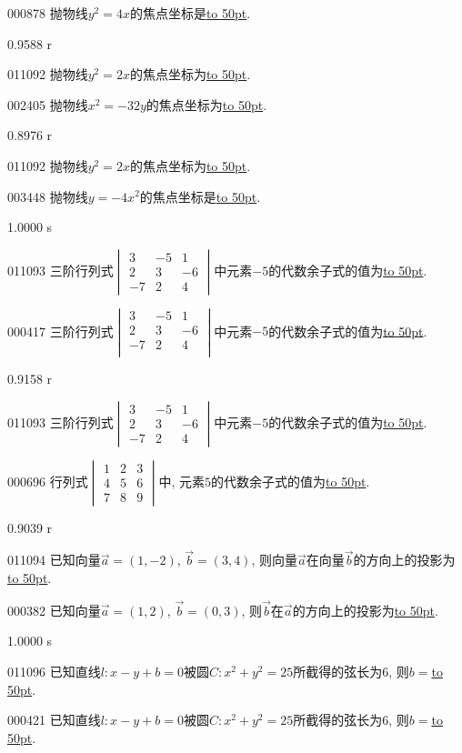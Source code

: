 \documentclass[10pt,a4paper]{article}
\newcommand{\blank}[1]{\underline{\hbox to #1pt{}}}
\begin{document}
000878	抛物线$y^2=4x$的焦点坐标是\blank{50}.

0.9588 r

011092	抛物线$y^2=2x$的焦点坐标为\blank{50}.

002405	抛物线$x^2=-32y$的焦点坐标为\blank{50}.

0.8976 r

011092	抛物线$y^2=2x$的焦点坐标为\blank{50}.

003448	抛物线$y=-4x^2$的焦点坐标是\blank{50}.

1.0000 s

011093	三阶行列式$\begin{vmatrix}
3 & -5 & 1  \\ 2 & 3 & -6  \\ -7 & 2 & 4  \end{vmatrix}$中元素$-5$的代数余子式的值为\blank{50}.

000417	三阶行列式$\begin{vmatrix}   3 & -5 & 1 \\   2 & 3 & -6 \\   -7 & 2 & 4 \\ \end{vmatrix}$中元素$-5$的代数余子式的值为\blank{50}.

0.9158 r

011093	三阶行列式$\begin{vmatrix}
3 & -5 & 1  \\ 2 & 3 & -6  \\ -7 & 2 & 4  \end{vmatrix}$中元素$-5$的代数余子式的值为\blank{50}.

000696	行列式$\begin{vmatrix} 1 & 2 & 3 \\ 4 & 5 & 6  \\ 7 & 8 & 9 \end{vmatrix}$中, 元素$5$的代数余子式的值为\blank{50}.

0.9039 r

011094	已知向量$\overrightarrow a=(1,-2)$, $\overrightarrow b=(3,4)$, 则向量$\overrightarrow a$在向量$\overrightarrow b$的方向上的投影为\blank{50}.

000382	已知向量$\overrightarrow{a}=(1,2)$, $\overrightarrow{b}=(0,3)$, 则$\overrightarrow{b}$在$\overrightarrow{a}$的方向上的投影为\blank{50}.

1.0000 s

011096	已知直线$l:x-y+b=0$被圆$C:x^2+y^2=25$所截得的弦长为$6$, 则$b=$\blank{50}.

000421	已知直线$l:x-y+b=0$被圆$C:x^2+y^2=25$所截得的弦长为$6$, 则$b=$\blank{50}.
\end{document}
